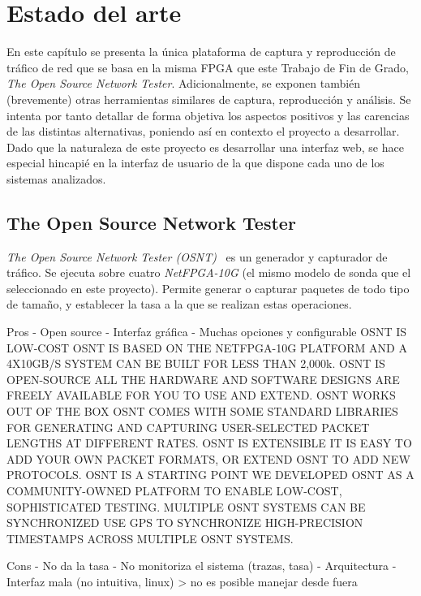 \chapter{Estado del arte\label{cap:estadoDelArte}}

En este capítulo se presenta la única plataforma de captura y reproducción de tráfico de red que se basa en la misma \gls{FPGA} que este Trabajo de Fin de Grado, \textit{The Open Source Network Tester}.
Adicionalmente, se exponen también (brevemente) otras herramientas similares de captura, reproducción y análisis.
Se intenta por tanto detallar de forma objetiva los aspectos positivos y las carencias de las distintas alternativas, poniendo así en contexto el proyecto a desarrollar.
Dado que la naturaleza de este proyecto es desarrollar una interfaz web, se hace especial hincapié en la interfaz de usuario de la que dispone cada uno de los sistemas analizados.

\section{The Open Source Network Tester\label{sec:eda:osnt}}

\textit{The Open Source Network Tester (OSNT)}~\cite{osnt} es un generador y capturador de tráfico.
Se ejecuta sobre cuatro \textit{NetFPGA-10G} (el mismo modelo de sonda que el seleccionado en este proyecto).
Permite generar o capturar paquetes de todo tipo de tamaño, y establecer la tasa a la que se realizan estas operaciones.

Pros
- Open source
- Interfaz gráfica
- Muchas opciones y configurable
OSNT IS LOW-COST
OSNT IS BASED ON THE NETFPGA-10G PLATFORM AND A 4X10GB/S SYSTEM CAN BE BUILT FOR LESS THAN 2,000k.
OSNT IS OPEN-SOURCE
ALL THE HARDWARE AND SOFTWARE DESIGNS ARE FREELY AVAILABLE FOR YOU TO USE AND EXTEND.
OSNT WORKS OUT OF THE BOX
OSNT COMES WITH SOME STANDARD LIBRARIES FOR GENERATING AND CAPTURING USER-SELECTED PACKET LENGTHS AT DIFFERENT RATES.
OSNT IS EXTENSIBLE
IT IS EASY TO ADD YOUR OWN PACKET FORMATS, OR EXTEND OSNT TO ADD NEW PROTOCOLS.
OSNT IS A STARTING POINT
WE DEVELOPED OSNT AS A COMMUNITY-OWNED PLATFORM TO ENABLE LOW-COST, SOPHISTICATED TESTING.
MULTIPLE OSNT SYSTEMS CAN BE SYNCHRONIZED
USE GPS TO SYNCHRONIZE HIGH-PRECISION TIMESTAMPS ACROSS MULTIPLE OSNT SYSTEMS.

Cons
- No da la tasa
- No monitoriza el sistema (trazas, tasa)
- Arquitectura
- Interfaz mala (no intuitiva, linux) > no es posible manejar desde fuera

